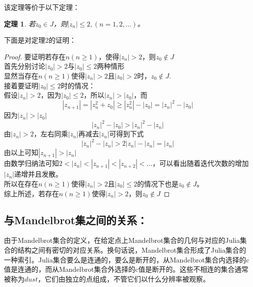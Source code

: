 \documentclass[UTF8,a4paper]{ctexart}
\newtheorem{thm}{定理}
\begin{document}
	该定理等价于以下定理：
	\begin{thm} 
		若$ z_{0}\in J $，则$ |z_{n}|\leq 2,(n=1,2,\dots) $。
	\end{thm}
	下面是对定理2的证明：
	\begin{proof}
		要证明若存在$ n(n\geq 1) $，使得$ |z_{n}|>2 $，则$ z_{0}\notin J $\\
		首先分别讨论$ |z_{0}|>2 $与$ |z_{0}|\leq 2 $两种情形\\
		显然当存在$ n(n\geq 1) $使得$ |z_{n}|>2 $且$ |z_{0}|>2 $时，$ z_{0}\notin J $.\\
		接着要证明$ |z_{0}|\leq 2 $时的情况：\\
		假设$ |z_{n}|>2 $，因为$ |z_{0}|\leq 2 $，所以$ |z_{n}|>|z_{0}| $，而\\
		\[|z_{n+1}|=|z_{n}^{2}+z_{0}|\geq|z_{n}^{2}|-|z_{0}|=|z_{n}|^{2}-|z_{0}|\]
		因为$ |z_{n}|>|z_{0}| $\\
		\[|z_{n}|^{2}-|z_{0}|>|z_{n}|^{2}-|z_{n}|\]
		由$ |z_{n}|>2 $，左右同乘$ |z_{n}| $再减去$ |z_{n}| $可得到下式\\
		\[|z_{n}|^{2}-|z_{n}|>2|z_{n}|-|z_{n}|=|z_{n}|\]
		由以上可知$ |z_{n+1}|>|z_{n}| $\\
		由数学归纳法可知$ 2<|z_{n}|<|z_{n+1}|<|z_{n+2}|<\dots $，可以看出随着迭代次数的增加$ |z_{n}| $递增并且发散。\\
		所以在存在$ n(n\geq 1) $使得$ |z_{n}|>2 $且$ |z_{0}|\leq 2 $的情况下也是$ z_{0}\notin J $。\\
		综上所述，若存在$ n(n\geq 1) $使得$ |z_{n}|>2 $，则$ z_{0}\notin J $
	\end{proof}
	\subsection{与Mandelbrot集之间的关系：}
	由于Mandelbrot集合的定义，在给定点上Mandelbrot集合的几何与对应的Julia集合的结构之间有密切的对应关系。换句话说，Mandelbrot集合形成了Julia集合的一种索引。\cite{lei1990similarity}Julia集合要么是连通的，要么是断开的，从Mandelbrot集合内选择的c值是连通的，而从Mandelbrot集合外选择的c值是断开的。这些不相连的集合通常被称为$ dust $，它们由独立的点组成，不管它们以什么分辨率被观察\cite{Juliaset}。
\end{document}
